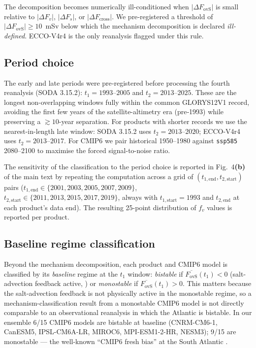 \documentclass[11pt,a4paper]{article}
\newcommand{\Fovs}{F_\mathrm{ovS}}
\newcommand{\dFv}{\Delta F_v}
\newcommand{\dFs}{\Delta F_s}
\newcommand{\dFc}{\Delta F_\mathrm{cross}}
\begin{document}
The decomposition becomes numerically ill-conditioned when $|\Delta\Fovs|$ is small relative to $|\dFv|$, $|\dFs|$, or $|\dFc|$. We pre‑registered a threshold of $|\Delta\Fovs| \ge 10$~mSv below which the mechanism decomposition is declared \emph{ill-defined}. ECCO-V4r4 is the only reanalysis flagged under this rule.

\subsection*{Period choice}

The early and late periods were pre‑registered before processing the fourth reanalysis (SODA 3.15.2): $t_1 = 1993$--$2005$ and $t_2 = 2013$--$2025$. These are the longest non-overlapping windows fully within the common GLORYS12V1 record, avoiding the first few years of the satellite-altimetry era (pre‑1993) while preserving a $\gtrsim10$-year separation. For products with shorter records we use the nearest-in-length late window: SODA 3.15.2 uses $t_2 = 2013$--$2020$; ECCO-V4r4 uses $t_2 = 2013$--$2017$. For CMIP6 we pair historical 1950--1980 against \texttt{ssp585} 2080--2100 to maximise the forced signal-to-noise ratio.

The sensitivity of the classification to the period choice is reported in Fig.~4\textbf{(b)} of the main text by repeating the computation across a grid of $(t_{1,\mathrm{end}}, t_{2,\mathrm{start}})$ pairs ($t_{1,\mathrm{end}}\in\{2001,2003,2005,2007,2009\}$, $t_{2,\mathrm{start}}\in\{2011,2013,2015,2017,2019\}$, always with $t_{1,\mathrm{start}}=1993$ and $t_{2,\mathrm{end}}$ at each product's data end). The resulting 25-point distribution of $f_v$ values is reported per product.

\subsection*{Baseline regime classification}

Beyond the mechanism decomposition, each product and CMIP6 model is classified by its \emph{baseline} regime at the $t_1$ window: \emph{bistable} if $\overline{\Fovs}(t_1) < 0$ (salt-advection feedback active, \citet{Rahmstorf1996}) or \emph{monostable} if $\overline{\Fovs}(t_1) > 0$. This matters because the salt-advection feedback is not physically active in the monostable regime, so a mechanism-classification result from a monostable CMIP6 model is not directly comparable to an observational reanalysis in which the Atlantic is bistable. In our ensemble 6/15 CMIP6 models are bistable at baseline (CNRM-CM6-1, CanESM5, IPSL-CM6A-LR, MIROC6, MPI-ESM1-2-HR, NESM3); 9/15 are monostable — the well-known ``CMIP6 fresh bias'' at the South Atlantic \citep{Mecking2017, Weijer2019, Portmann2026}.
\end{document}
